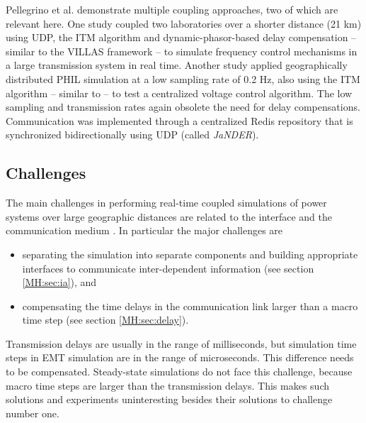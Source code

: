 \documentclass[a4paper,ngerman]{atseminar}
\begin{document}

Pellegrino et al. \cite{strasser2019, pellegrino2020} demonstrate multiple coupling approaches, two of which are relevant here. One study coupled two laboratories over a shorter distance (21 km) using UDP, the ITM algorithm and dynamic-phasor-based delay compensation -- similar to the VILLAS framework -- to simulate frequency control mechanisms in a large transmission system in real time. Another study applied geographically distributed PHIL simulation at a low sampling rate of 0.2 Hz, also using the ITM algorithm -- similar to \cite{palmintier2015} -- to test a centralized voltage control algorithm. The low sampling and transmission rates again obsolete the need for delay compensations. Communication was implemented through a centralized Redis repository that is synchronized bidirectionally using UDP (called \textit{JaNDER}).

\subsection{Challenges}
\label{MH:sec:challenges}

The main challenges in performing real-time coupled simulations of power systems over large geographic distances are related to the interface and the communication medium \cite{montoya2020}. In particular the major challenges are

\begin{itemize}
    \item separating the simulation into separate components and building appropriate interfaces to communicate inter-dependent information (see section \ref{MH:sec:ia}), and
    \item compensating the time delays in the communication link larger than a macro time step (see section \ref{MH:sec:delay}).
\end{itemize}

Transmission delays are usually in the range of milliseconds, but simulation time steps in EMT simulation are in the range of microseconds. This difference needs to be compensated. Steady-state simulations do not face this challenge, because macro time steps are larger than the transmission delays. This makes such solutions and experiments \cite{palmintier2015, lundstrom2017, pellegrino2020} uninteresting besides their solutions to challenge number one.
\end{document}
